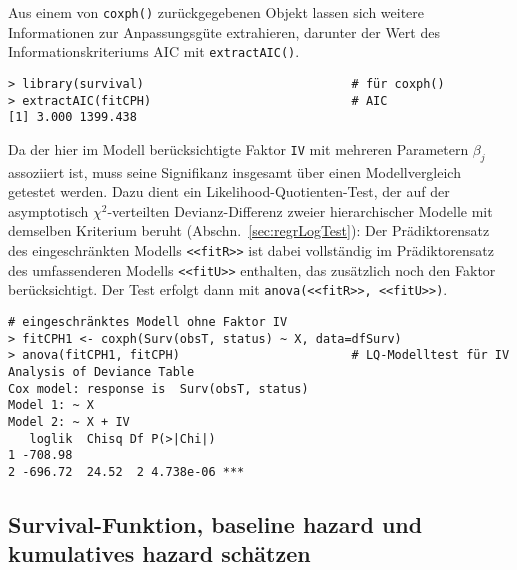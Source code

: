 Aus einem von \lstinline!coxph()! zurückgegebenen Objekt lassen sich weitere Informationen zur Anpassungsgüte extrahieren, darunter der Wert des Informationskriteriums AIC mit \lstinline!extractAIC()!.
\begin{lstlisting}
> library(survival)                             # für coxph()
> extractAIC(fitCPH)                            # AIC
[1] 3.000 1399.438
\end{lstlisting}

Da der hier im Modell berücksichtigte Faktor \lstinline!IV! mit mehreren Parametern $\beta_{j}$ assoziiert ist, muss seine Signifikanz insgesamt über einen Modellvergleich getestet werden. Dazu dient ein Likelihood-Quotienten-Test, der auf der asymptotisch $\chi^{2}$-verteilten Devianz-Differenz zweier hierarchischer Modelle mit demselben Kriterium beruht (Abschn.\ \ref{sec:regrLogTest}): Der Prädiktorensatz des eingeschränkten Modells \lstinline!<<fitR>>! ist dabei vollständig im Prädiktorensatz des umfassenderen Modells \lstinline!<<fitU>>! enthalten, das zusätzlich noch den Faktor berücksichtigt. Der Test erfolgt dann mit \lstinline!anova(<<fitR>>, <<fitU>>)!.
\begin{lstlisting}
# eingeschränktes Modell ohne Faktor IV
> fitCPH1 <- coxph(Surv(obsT, status) ~ X, data=dfSurv)
> anova(fitCPH1, fitCPH)                        # LQ-Modelltest für IV
Analysis of Deviance Table
Cox model: response is  Surv(obsT, status)
Model 1: ~ X
Model 2: ~ X + IV
   loglik  Chisq Df P(>|Chi|)
1 -708.98
2 -696.72  24.52  2 4.738e-06 ***
\end{lstlisting}

\subsection{Survival-Funktion, baseline hazard und kumulatives hazard schätzen}
\label{sec:CoxHat}


